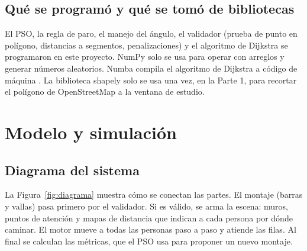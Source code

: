 \documentclass[11pt,letterpaper]{article}
\begin{document}
\begin{table}[H]
\centering
\caption{PSO con la configuración del proyecto sobre la función de Rastrigin (20 semillas).}
\label{tab:rastrigin}

\end{table}

\subsection{Qué se programó y qué se tomó de bibliotecas}
El PSO, la regla de paro, el manejo del ángulo, el validador (prueba de punto en polígono, distancias a segmentos, penalizaciones) y el algoritmo de Dijkstra se programaron en este proyecto. NumPy solo se usa para operar con arreglos y generar números aleatorios. Numba compila el algoritmo de Dijkstra a código de máquina \citep{lam2015,numbadocs}. La biblioteca shapely solo se usa una vez, en la Parte 1, para recortar el polígono de OpenStreetMap a la ventana de estudio.

\section{Modelo y simulación}

\subsection{Diagrama del sistema}
La Figura~\ref{fig:diagrama} muestra cómo se conectan las partes. El montaje (barras y vallas) pasa primero por el validador. Si es válido, se arma la escena: muros, puntos de atención y mapas de distancia que indican a cada persona por dónde caminar. El motor mueve a todas las personas paso a paso y atiende las filas. Al final se calculan las métricas, que el PSO usa para proponer un nuevo montaje.
\end{document}
